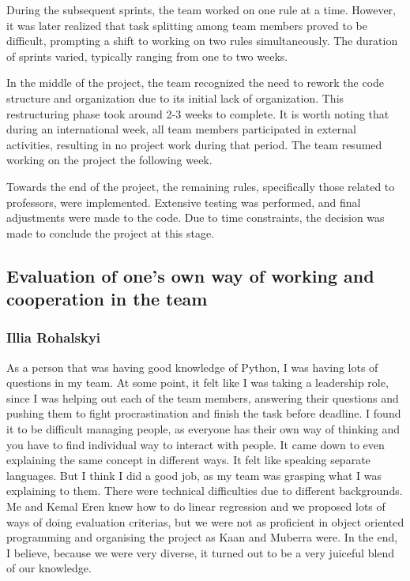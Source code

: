 \vspace{\baselineskip}

During the subsequent sprints, the team worked on one rule at a time. However, it was later realized that task splitting among team members proved to be difficult, prompting a shift to working on two rules simultaneously. The duration of sprints varied, typically ranging from one to two weeks.


\vspace{\baselineskip}

In the middle of the project, the team recognized the need to rework the code structure and organization due to its initial lack of organization. This restructuring phase took around 2-3 weeks to complete. It is worth noting that during an international week, all team members participated in external activities, resulting in no project work during that period. The team resumed working on the project the following week.

\vspace{\baselineskip}


Towards the end of the project, the remaining rules, specifically those related to professors, were implemented. Extensive testing was performed, and final adjustments were made to the code. Due to time constraints, the decision was made to conclude the project at this stage.


\subsection{Evaluation of one's own way of working and cooperation in the team}

\subsubsection{Illia Rohalskyi}

As a person that was having good knowledge of Python, I was having lots of questions in my team. At some point, it felt like I was taking a leadership role, since I was helping out each of the team members, answering their questions and pushing them to fight procrastination and finish the task before deadline. I found it to be difficult managing people, as everyone has their own way of thinking and you have to find individual way to interact with people. It came down to even explaining the same concept in different ways. It felt like speaking separate languages. But I think I did a good job, as my team was grasping what I was explaining to them. There were technical difficulties due to different backgrounds. Me and Kemal Eren knew how to do linear regression and we proposed lots of ways of doing evaluation criterias, but we were not as proficient in object oriented programming and organising the project as Kaan and Muberra were. In the end, I believe, because we were very diverse, it turned out to be a very juiceful blend of our knowledge. 


